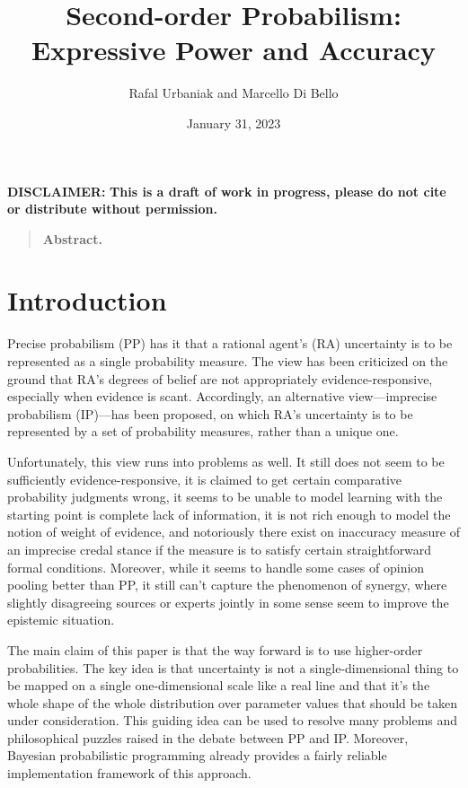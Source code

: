 \documentclass[
  10pt,
  dvipsnames,enabledeprecatedfontcommands]{scrartcl}
\title{Second-order Probabilism: Expressive Power and Accuracy}
\author{Rafal Urbaniak and Marcello Di Bello}
\date{January 31, 2023}
\begin{document}
\maketitle

{
\hypersetup{linkcolor=}
\setcounter{tocdepth}{2}
\tableofcontents
}
\vspace{2cm}

\noindent \textbf{DISCLAIMER:}
\textbf{This is a draft of work in progress, please do not cite or distribute without permission.}

\thispagestyle{empty}

\newpage

\begin{quote} \textbf{Abstract.}  

\end{quote}

\hypertarget{introduction}{%
\section{Introduction}\label{introduction}}

\label{sec:introduction}

Precise probabilism (PP) has it that a rational agent's (RA) uncertainty
is to be represented as a single probability measure. The view has been
criticized on the ground that RA's degrees of belief are not
appropriately evidence-responsive, especially when evidence is scant.
Accordingly, an alternative view---imprecise probabilism (IP)---has been
proposed, on which RA's uncertainty is to be represented by a set of
probability measures, rather than a unique one.

Unfortunately, this view runs into problems as well. It still does not
seem to be sufficiently evidence-responsive, it is claimed to get
certain comparative probability judgments wrong, it seems to be unable
to model learning with the starting point is complete lack of
information, it is not rich enough to model the notion of weight of
evidence, and notoriously there exist on inaccuracy measure of an
imprecise credal stance if the measure is to satisfy certain
straightforward formal conditions. Moreover, while it seems to handle
some cases of opinion pooling better than PP, it still can't capture the
phenomenon of synergy, where slightly disagreeing sources or experts
jointly in some sense seem to improve the epistemic situation.

The main claim of this paper is that the way forward is to use
higher-order probabilities. The key idea is that uncertainty is not a
single-dimensional thing to be mapped on a single one-dimensional scale
like a real line and that it's the whole shape of the whole distribution
over parameter values that should be taken under consideration. This
guiding idea can be used to resolve many problems and philosophical
puzzles raised in the debate between PP and IP. Moreover, Bayesian
probabilistic programming already provides a fairly reliable
implementation framework of this approach.
\end{document}
